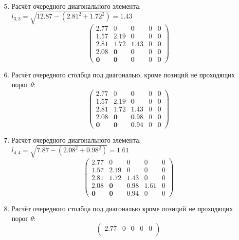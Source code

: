 \begin{multicols}{3}
    \columnbreak
    \begin{enumerate}
    \setcounter{enumi}{4}
        \item Расчёт очередного диагонального элемента: $l_{3,3} = \sqrt{12.87 - (2.81^2+1.72^2)} = 1.43$
    $$\begin{pmatrix}
        2.77       & 0          & 0    & 0 & 0 \\
        1.57       & 2.19       & 0    & 0 & 0 \\
        2.81       & 1.72       & 1.43 & 0 & 0 \\
        2.08       & \mathbf{0} & 0    & 0 & 0 \\
        \mathbf{0} & \mathbf{0} & 0    & 0 & 0
    \end{pmatrix}$$
    \vspace{-0.5cm}
    \item Расчёт очередного столбца под диагональю, кроме позиций не проходящих порог $\theta$:
    $$\begin{pmatrix}
        2.77       & 0          & 0    & 0 & 0 \\
        1.57       & 2.19       & 0    & 0 & 0 \\
        2.81       & 1.72       & 1.43 & 0 & 0 \\
        2.08       & \mathbf{0} & 0.98 & 0 & 0 \\
        \mathbf{0} & \mathbf{0} & 0.94 & 0 & 0
    \end{pmatrix}$$
    \vspace{-0.5cm}
    \item Расчёт очередного диагонального элемента: $l_{4,4} = \sqrt{7.87 - (2.08^2+0.98^2)} = 1.61$
    $$\begin{pmatrix}
        2.77       & 0          & 0    & 0    & 0 \\
        1.57       & 2.19       & 0    & 0    & 0 \\
        2.81       & 1.72       & 1.43 & 0    & 0 \\
        2.08       & \mathbf{0} & 0.98 & 1.61 & 0 \\
        \mathbf{0} & \mathbf{0} & 0.94 & 0    & 0
    \end{pmatrix}$$
    \vspace{-0.5cm}
    \item Расчёт очередного столбца под диагональю кроме позиций не проходящих порог $\theta$:
    $$\begin{pmatrix}
        2.77       & 0          & 0    & 0    & 0 \\

\end{pmatrix}$$
\end{enumerate}
\end{multicols}
